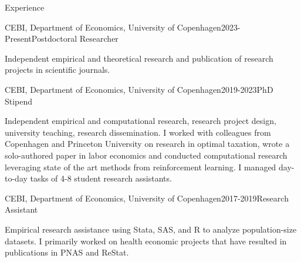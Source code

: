 \documentclass[
	10pt, %
]{resume} %
\begin{document}
\begin{rSection}{Experience}
    \begin{rSubsection}{CEBI, Department of Economics, University of Copenhagen}{2023-Present}{Postdoctoral Researcher}{}
        \item[] Independent empirical and theoretical research and publication of research projects in scientific journals.
    \end{rSubsection}

    \begin{rSubsection}{CEBI, Department of Economics, University of Copenhagen}{2019-2023}{PhD Stipend}{}
        \item[] Independent empirical and computational research, research project design, university teaching, research dissemination. I worked with colleagues from Copenhagen and Princeton University on research in optimal taxation, wrote a solo-authored paper in labor economics and conducted computational research leveraging state of the art methods from reinforcement learning. I managed day-to-day tasks of 4-8 student research assistants.
    \end{rSubsection}

    \begin{rSubsection}{CEBI, Department of Economics, University of Copenhagen}{2017-2019}{Research Assistant}{}
        \item[] Empirical research assistance using Stata, SAS, and R to analyze population-size datasets. I primarily worked on health economic projects that have resulted in publications in PNAS and ReStat.
    \end{rSubsection}


\end{rSection}
\end{document}
